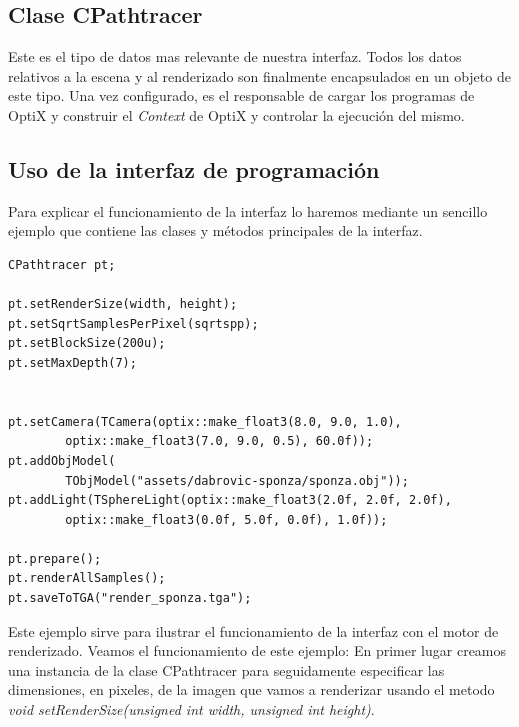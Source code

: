\subsection{Clase CPathtracer}

Este es el tipo de datos mas relevante de nuestra interfaz. Todos los datos relativos a la escena y al renderizado son finalmente encapsulados en un objeto de este tipo. Una vez configurado, es el responsable de cargar los programas de OptiX y construir el \emph{Context} de OptiX y controlar la ejecución del mismo.

\subsection{Uso de la interfaz de programación}

Para explicar el funcionamiento de la interfaz lo haremos mediante un sencillo ejemplo que contiene las clases y métodos principales de la interfaz.




\lstset{style=customc}

\begin{lstlisting}
CPathtracer pt;

pt.setRenderSize(width, height);
pt.setSqrtSamplesPerPixel(sqrtspp);
pt.setBlockSize(200u);
pt.setMaxDepth(7);


pt.setCamera(TCamera(optix::make_float3(8.0, 9.0, 1.0), 
		optix::make_float3(7.0, 9.0, 0.5), 60.0f));
pt.addObjModel(
		TObjModel("assets/dabrovic-sponza/sponza.obj"));
pt.addLight(TSphereLight(optix::make_float3(2.0f, 2.0f, 2.0f),
		optix::make_float3(0.0f, 5.0f, 0.0f), 1.0f));

pt.prepare();
pt.renderAllSamples();
pt.saveToTGA("render_sponza.tga");
\end{lstlisting}

Este ejemplo sirve para ilustrar el funcionamiento de la interfaz con el motor de renderizado.
Veamos el funcionamiento de este ejemplo:
En primer lugar creamos una instancia de la clase CPathtracer para seguidamente especificar las dimensiones, en pixeles, de la imagen que vamos a renderizar usando el metodo \emph{void setRenderSize(unsigned int width, unsigned int height)}. 

